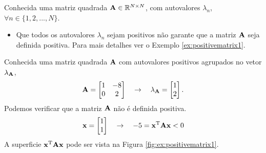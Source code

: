 \begin{tcbattention}
Conhecida uma matriz quadrada $\MATRIX{A} \in \mathbb{R}^{N \times N}$, 
com  autovalores $\lambda_n$, $\forall n \in \{1, 2, ..., N\}$.
\begin{itemize}
\item Que todos os autovalores $\lambda_n$ sejam positivos não garante que a matriz $\MATRIX{A}$
seja definida positiva. Para mais detalhes ver o Exemplo \ref{ex:positivematrix1}.
\end{itemize}
\end{tcbattention}

\noindent
\begin{minipage}{0.5\textwidth}
\begin{example}
\label{ex:positivematrix1}
Conhecida uma matriz quadrada $\MATRIX{A}$ com autovalores positivos agrupados no vetor $\VECTOR{\lambda}_{\MATRIX{A}}$, 
\begin{equation}
\MATRIX{A}=
\begin{bmatrix}
1 & -8\\
0 & 2
\end{bmatrix}
\quad \rightarrow \quad 
\VECTOR{\lambda}_{\MATRIX{A}}=
\begin{bmatrix}
1 \\
2
\end{bmatrix}.
\end{equation}
Podemos verificar que a matriz $\MATRIX{A}$ não é definida positiva.
\begin{equation}
\VECTOR{x}=
\begin{bmatrix}
1 \\
1
\end{bmatrix}
\quad \rightarrow \quad 
-5 = \VECTOR{x}^{\transpose}\MATRIX{A}\VECTOR{x}<0
\end{equation}
A superficie $\VECTOR{x}^{\transpose}\MATRIX{A}\VECTOR{x}$ 
pode ser vista na Figura \ref{fig:ex:positivematrix1}.
\end{example}
\end{minipage}
